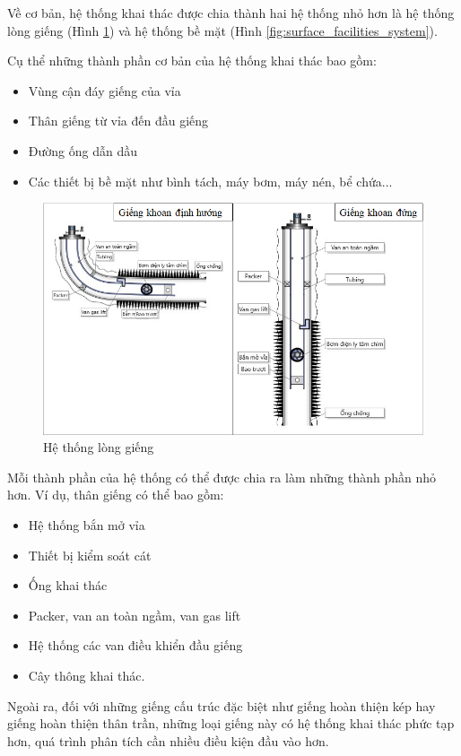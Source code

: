 \documentclass[12pt,a4paper]{report}
\begin{document}
Về cơ bản, hệ thống khai thác được chia thành hai hệ thống nhỏ hơn là hệ thống lòng giếng (Hình \ref{fig:well_facilities_system}) và hệ thống bề mặt (Hình \ref{fig:surface_facilities_system}).

Cụ thể những thành phần cơ bản của hệ thống khai thác bao gồm:
	\begin{itemize}
		\item Vùng cận đáy giếng của vỉa
		\item Thân giếng từ vỉa đến đầu giếng
		\item Đường ống dẫn dầu
		\item Các thiết bị bề mặt như bình tách, máy bơm, máy nén, bể chứa...
	\end{itemize}
	\begin{figure}[h]
		\centering
		\includegraphics[scale=0.8]{Fig/well_facilities_system.png}
		\caption{Hệ thống lòng giếng}
		\label{fig:well_facilities_system}
	\end{figure}
\newpage
Mỗi thành phần của hệ thống có thể được chia ra làm những thành phần nhỏ hơn. Ví dụ, thân giếng có thể bao gồm:
	\begin{itemize}
		\item Hệ thống bắn mở vỉa
		\item Thiết bị kiểm soát cát
		\item Ống khai thác
		\item Packer, van an toàn ngầm, van gas lift
		\item Hệ thống các van điều khiển đầu giếng
		\item Cây thông khai thác.
	\end{itemize}
Ngoài ra, đối với những giếng cấu trúc đặc biệt như giếng hoàn thiện kép hay giếng hoàn thiện thân trần, những loại giếng này có hệ thống khai thác phức tạp hơn, quá trình phân tích cần nhiều điều kiện đầu vào hơn.
\end{document}
